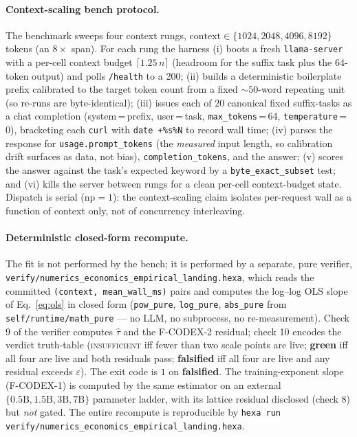 \documentclass[11pt,a4paper]{article}
\newcommand{\green}[1]{\textcolor{green!50!black}{\textbf{#1}}}
\newcommand{\red}[1]{\textcolor{red!70!black}{\textbf{#1}}}
\newcommand{\ctx}{\ensuremath{n}}
\newcommand{\taum}{\ensuremath{\hat{\tau}}}
\begin{document}
\paragraph{Context-scaling bench protocol.}
The benchmark sweeps four context rungs,
\(\mathrm{context} \in \{1024, 2048, 4096, 8192\}\) tokens (an \(8\times\) span).
For each rung the harness (i) boots a fresh \texttt{llama-server} with a
per-cell context budget \(\lceil 1.25\,\ctx\rceil\) (headroom for the suffix
task plus the 64-token output) and polls \texttt{/health} to a 200; (ii) builds
a deterministic boilerplate prefix calibrated to the target token count from a
fixed \(\sim\!50\)-word repeating unit (so re-runs are byte-identical); (iii)
issues each of \(20\) canonical fixed suffix-tasks as a chat completion
(system\,=\,prefix, user\,=\,task, \texttt{max\_tokens}\,=\,64,
\texttt{temperature}\,=\,0), bracketing each \texttt{curl} with
\texttt{date +\%s\%N} to record wall time; (iv) parses the response for
\texttt{usage.prompt\_tokens} (the \emph{measured} input length, so calibration
drift surfaces as data, not bias), \texttt{completion\_tokens}, and the answer;
(v) scores the answer against the task's expected keyword by a
\texttt{byte\_exact\_subset} test; and (vi) kills the server between rungs for a
clean per-cell context-budget state. Dispatch is serial (\(\mathrm{np}=1\)): the
context-scaling claim isolates per-request wall as a function of context only,
not of concurrency interleaving.

\paragraph{Deterministic closed-form recompute.}
The fit is not performed by the bench; it is performed by a separate, pure
verifier, \texttt{verify/numerics\_economics\_empirical\_landing.hexa}, which
reads the committed \texttt{(context, mean\_wall\_ms)} pairs and computes the
log--log OLS slope of Eq.~\eqref{eq:ols} in closed form (\texttt{pow\_pure},
\texttt{log\_pure}, \texttt{abs\_pure} from \texttt{self/runtime/math\_pure} ---
no LLM, no subprocess, no re-measurement). Check 9 of the verifier computes
\(\taum\) and the F-CODEX-2 residual; check 10 encodes the verdict truth-table
(\textsc{insufficient} iff fewer than two scale points are live;
\green{green} iff all four are live and both residuals pass; \red{falsified}
iff all four are live and any residual exceeds \(\varepsilon\)). The exit code is
\(1\) on \red{falsified}. The training-exponent slope (F-CODEX-1) is computed by
the same estimator on an external \(\{0.5\text{B}, 1.5\text{B}, 3\text{B},
7\text{B}\}\) parameter ladder, with its lattice residual disclosed (check 8)
but \emph{not} gated. The entire recompute is reproducible by
\texttt{hexa run verify/numerics\_economics\_empirical\_landing.hexa}.
\end{document}
